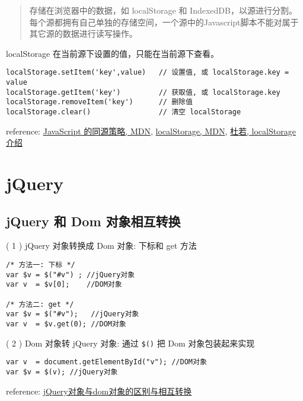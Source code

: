 \begin{quote}
存储在浏览器中的数据，如 localStorage 和 IndexedDB，以源进行分割。每个源都拥有自己单独的存储空间，一个源中的Javascript脚本不能对属于其它源的数据进行读写操作。
\end{quote}

localStorage 在当前源下设置的值，只能在当前源下查看。

\begin{verbatim}localStorage.setItem('key',value)   // 设置值, 或 localStorage.key = value
localStorage.getItem('key')         // 获取值, 或 localStorage.key
localStorage.removeItem('key')      // 删除值
localStorage.clear()                // 清空 localStorage
\end{verbatim}

reference: \href{https://developer.mozilla.org/zh-CN/docs/Web/Security/Same-origin\_policy}{JavaScript 的同源策略, MDN}, \href{https://developer.mozilla.org/en-US/docs/Web/API/Storage/LocalStorage}{localStorage, MDN}, \href{http://wikieswan.github.io/javascript/2015/04/03/html5-api-localstorage/}{杜若, localStorage 介绍}

\section{jQuery}\hypertarget{jquery}{}\label{jquery}

\subsection{jQuery 和 Dom 对象相互转换}\hypertarget{jquery--dom-}{}\label{jquery--dom-}

( 1 ) jQuery 对象转换成 Dom 对象: 下标和 get 方法

\begin{verbatim}/* 方法一: 下标 */
var $v = $("#v") ; //jQuery对象
var v  = $v[0];    //DOM对象

/* 方法二: get */
var $v = $("#v");   //jQuery对象
var v  = $v.get(0); //DOM对象
\end{verbatim}

( 2 ) Dom 对象转 jQuery 对象: 通过 \texttt{\$()} 把 Dom 对象包装起来实现

\begin{verbatim}var v  = document.getElementById("v"); //DOM对象
var $v = $(v); //jQuery对象
\end{verbatim}

reference: \href{http://segmentfault.com/a/1190000003710344}{jQuery对象与dom对象的区别与相互转换}

